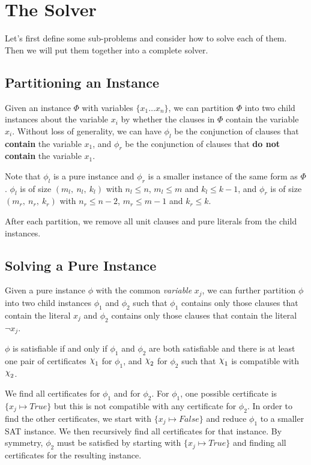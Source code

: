 \section{The Solver}
\label{sec:the-solver}

Let's first define some sub-problems and consider how to solve each of them.
Then we will put them together into a complete solver.

\subsection{Partitioning an Instance}
\label{subsec:partitioning-an-instance}

Given an instance $\Phi$ with variables $\{ x_1 \dots x_n \}$, we can partition $\Phi$ into two child instances about the variable $x_i$ by whether the clauses in $\Phi$ contain the variable $x_i$.
Without loss of generality, we can have $\phi_l$ be the conjunction of clauses that \textbf{contain} the variable $x_1$, and $\phi_r$ be the conjunction of clauses that \textbf{do not contain} the variable $x_1$.

Note that $\phi_l$ is a pure instance and $\phi_r$ is a smaller instance of the same form as $\Phi$.
$\phi_{l}$ is of size $(m_l,~ n_l,~ k_l)$ with $n_l \leq n$, $m_l \leq m$ and $k_l \leq k - 1$, and $\phi_r$ is of size $(m_r,~ n_r,~ k_r)$ with $n_r \leq n - 2$, $m_r \leq m - 1$ and $k_r \leq k$.

After each partition, we remove all unit clauses and pure literals from the child instances.

\subsection{Solving a Pure Instance}
\label{subsec:solving-a-pure-instance}

Given a pure instance $\phi$ with the common \textit{variable} $x_j$, we can further partition $\phi$ into two child instances $\phi_1$ and $\phi_2$ such that $\phi_1$ contains only those clauses that contain the literal $x_j$ and $\phi_2$ contains only those clauses that contain the literal $\lnot x_j$.

$\phi$ is satisfiable if and only if $\phi_1$ and $\phi_2$ are both satisfiable and there is at least one pair of certificates $\rchi_1$ for $\phi_1$, and $\rchi_2$ for $\phi_2$ such that $\rchi_1$ is compatible with $\rchi_2$.

We find all certificates for $\phi_1$ and for $\phi_2$.
For $\phi_1$, one possible certificate is $\{ x_j \mapsto True \}$ but this is not compatible with any certificate for $\phi_2$.
In order to find the other certificates, we start with $\{ x_j \mapsto False \}$ and reduce $\phi_1$ to a smaller SAT instance.
We then recursively find all certificates for that instance.
By symmetry, $\phi_2$ must be satisfied by starting with $\{ x_j \mapsto True \}$ and finding all certificates for the resulting instance.


